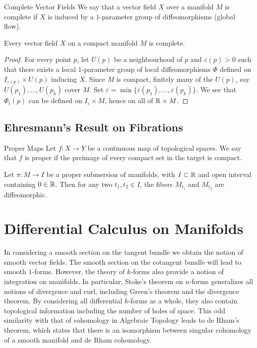 \documentclass[a4paper]{article}
\begin{document}
\begin{defn}{Complete Vector Fields}{} We say that a vector field $X$ over a manifold $M$ is complete if $X$ is induced by a $1$-parameter group of diffeomorphisms (global flow). 
\end{defn}

\begin{prp}{}{} Every vector field $X$ on a compact manifold $M$ is complete. \tcbline
\begin{proof}
For every point $p$, let $U(p)$ be a neighbourhood of $p$ and $\varepsilon(p)>0$ such that there exists a local $1$-parameter group of local diffeomorphisms $\Phi$ defined on $I_{\varepsilon(p)}\times U(p)$ inducing $X$. Since $M$ is compact, finitely many of the $U(p)$, say $U(p_1),\dots,U(p_k)$ cover $M$. Set $\varepsilon=\min\{\varepsilon(p_1),\dots,\varepsilon(p_k)\}$. We see that $\Phi_t(p)$ can be defined on $I_\varepsilon\times M$, hence on all of $\mathbb{R}\times M$. 
\end{proof}
\end{prp}

\subsection{Ehresmann's Result on Fibrations}
\begin{defn}{Proper Maps}{} Let $f:X\to Y$ be a continuous map of topological spaces. We say that $f$ is proper if the preimage of every compact set in the target is compact. 
\end{defn}

\begin{thm}{}{} Let $\pi:M\to I$ be a proper submersion of manifolds, with $I\subset\mathbb{R}$ and open interval containing $0\in\mathbb{R}$. Then for any two $t_1,t_2\in I$, the fibers $M_{t_1}$ and $M_{t_2}$ are diffeomorphic. 
\end{thm}

\pagebreak
\section{Differential Calculus on Manifolds}
In considering a smooth section on the tangent bundle we obtain the notion of smooth vector fields. The smooth section on the cotangent bundle will lead to smooth $1$-forms. However, the theory of $k$-forms also provide a notion of integration on manifolds. In particular, Stoke's theorem on $n$-forms generalizes all notions of divergence and curl, including Green's theorem and the divergence theorem. By considering all differential $k$-forms as a whole, they also contain topological information including the number of holes of space. This odd similarity with that of cohomology in Algebraic Topology leads to de Rham's theorem, which states that there is an isomorphism between singular cohomology of a smooth manifold and de Rham cohomology. 
\end{document}
